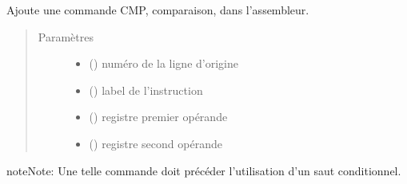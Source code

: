 \documentclass[letterpaper,10pt,french]{sphinxmanual}
\begin{document}
\begin{fulllineitems}
\begin{fulllineitems}
\label{\detokenize{assembleurcontainer:assembleurcontainer.AssembleurContainer.pushCmp}}
Ajoute une commande CMP, comparaison, dans l’assembleur.
\begin{quote}\begin{description}
\item[{Paramètres}] \leavevmode\begin{itemize}
\item {} 
 () \textendash{} numéro de la ligne d’origine

\item {} 
 (\sphinxstyleliteralemphasis{\sphinxupquote{{[}}}{\hyperref[\detokenize{label:label.Label}]{\sphinxcrossref{\sphinxstyleliteralemphasis{\sphinxupquote{Label}}}}}\sphinxstyleliteralemphasis{\sphinxupquote{{]}}}) \textendash{} label de l’instruction

\item {} 
 () \textendash{} registre premier opérande

\item {} 
 () \textendash{} registre second opérande

\end{itemize}

\end{description}\end{quote}

\begin{sphinxadmonition}{note}{Note:}
Une telle commande doit précéder l’utilisation d’un saut conditionnel.
\end{sphinxadmonition}

\end{fulllineitems}



\end{fulllineitems}
\end{document}
